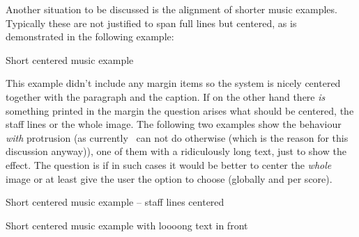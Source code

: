 \documentclass[DIV=12]{scrartcl}
\begin{document}
Another situation to be discussed is the alignment of shorter music examples. Typically these are not justified to span full lines but centered, as is demonstrated in the following example:

\begin{musicExampleNonFloat}
\caption{Short centered music example}
\label{xmp:short-centered-example}
\end{musicExampleNonFloat}

This example didn't include any margin items so the system is nicely centered together with the paragraph and the caption.  If on the other hand there \emph{is} something printed in the margin the question arises what should be centered, the staff lines or the whole image.  The following two examples show the behaviour \emph{with} protrusion (as currently \lyluatex\ can not do otherwise (which is the reason for this discussion anyway)), one of them with a ridiculously long text, just to show the effect.  The question is if in such cases it would be better to center the \emph{whole} image or at least give the user the option to choose (globally and per score).

\begin{musicExampleNonFloat}
\caption{Short centered music example -- staff lines centered}
\end{musicExampleNonFloat}

\begin{musicExampleNonFloat}
\caption{Short centered music example with loooong text in front}
\end{musicExampleNonFloat}
\end{document}

